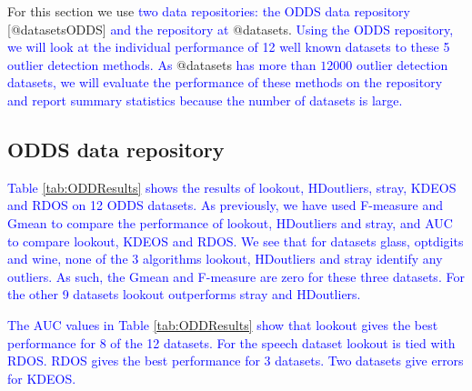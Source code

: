 \documentclass[
]{article}
\begin{document}
For this section we use
\textcolor{blue}{two data repositories: the ODDS data repository}
{[}@datasetsODDS{]} \textcolor{blue}{and the repository at} @datasets.
\textcolor{blue}{Using the ODDS repository, we will look at the individual performance of 12 well known datasets to these 5 outlier detection methods. As}
@datasets
\textcolor{blue}{ has more than $12000$ outlier detection datasets, we will evaluate the performance of these methods on the repository and report summary statistics because the number of datasets is large. }

\hypertarget{odds-data-repository}{%
\subsection{ODDS data repository}\label{odds-data-repository}}

\textcolor{blue}{Table \ref{tab:ODDResults} shows the results of lookout, HDoutliers, stray, KDEOS and RDOS on  12 ODDS datasets. As previously, we have used F-measure and Gmean to compare the performance of lookout,  HDoutliers and stray, and AUC to compare lookout, KDEOS and RDOS. We see that for datasets glass, optdigits and wine, none of the 3 algorithms lookout, HDoutliers and stray identify any outliers. As such, the Gmean and F-measure are zero for these three datasets.  For the other 9 datasets lookout outperforms stray and HDoutliers.  }

\textcolor{blue}{The AUC values in Table \ref{tab:ODDResults} show that lookout gives the best performance for 8 of the 12 datasets. For the speech dataset lookout is tied with RDOS. RDOS gives the best performance for 3 datasets. Two datasets give errors for KDEOS.
}
\end{document}
